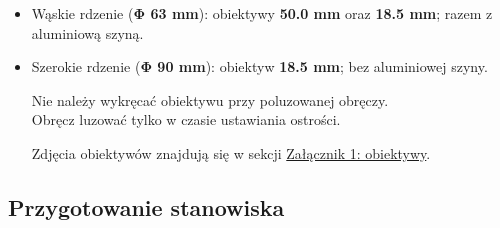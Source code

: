 \documentclass[
  letterpaper,
  DIV=11,
  numbers=noendperiod]{scrreprt}
\begin{document}
\begin{itemize}
\item
  Wąskie rdzenie (\textbf{Φ 63 mm}): obiektywy \textbf{50.0 mm} oraz
  \textbf{18.5 mm}; razem z aluminiową szyną.
\item
  Szerokie rdzenie (\textbf{Φ 90 mm}): obiektyw \textbf{18.5 mm}; bez
  aluminiowej szyny.

  Nie należy wykręcać obiektywu przy poluzowanej obręczy.\\
  Obręcz luzować tylko w czasie ustawiania ostrości.

  Zdjęcia obiektywów znajdują się w sekcji
  \protect\hyperlink{zaux142ux105cznik-1-obiektywy}{Załącznik 1:
  obiektywy}.
\end{itemize}

\hypertarget{przygotowanie-stanowiska}{%
\subsection{Przygotowanie stanowiska}\label{przygotowanie-stanowiska}}
\end{document}
